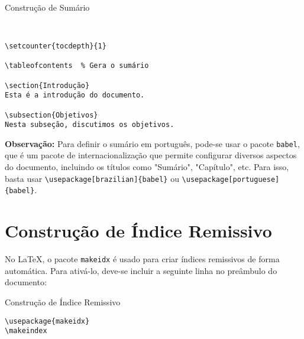 \begin{trailer}{Constru\c c\~ao de Sum\'ario}
\begin{verbatim} 


\setcounter{tocdepth}{1}

\tableofcontents  % Gera o sumário

\section{Introdução}
Esta é a introdução do documento.

\subsection{Objetivos}
Nesta subseção, discutimos os objetivos.

 \end{verbatim}
\end{trailer}

\noindent \textbf{Observação:} Para definir o sumário em português, pode-se usar o pacote \verb|babel|, que é um pacote de internacionalização que permite configurar diversos aspectos do documento, incluindo os títulos como "Sumário", "Capítulo", etc. Para isso, basta usar \verb|\usepackage[brazilian]{babel}| ou \verb|\usepackage[portuguese]{babel}|.



\section{Constru\c c\~ao de \'Indice Remissivo}
\label{sec:2}

No \LaTeX{}, o pacote \verb|makeidx| é usado para criar índices remissivos de forma automática. Para ativá-lo, deve-se incluir a seguinte linha no preâmbulo do documento:

\begin{trailer}{Constru\c c\~ao de \'Indice Remissivo}
\begin{verbatim} 
\usepackage{makeidx}
\makeindex \end{verbatim}
\end{trailer}

